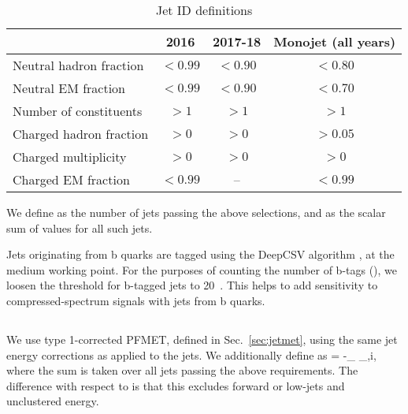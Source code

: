 \begin{table}[h]
\caption{Jet ID definitions}
\label{tab:jet_id}
\centering
\begin{tabular}{l|c|c|c}
\hline
 & 2016 & 2017-18 & Monojet (all years) \\ \hline
Neutral hadron fraction & $<0.99$ & $<0.90$ & $<0.80$ \\
Neutral EM fraction & $<0.99$ & $<0.90$ & $<0.70$ \\
Number of constituents & $>1$ & $>1$ & $>1$ \\
Charged hadron fraction & $>0$ & $>0$ & $>0.05$ \\
Charged multiplicity & $>0$ & $>0$ & $>0$ \\
Charged EM fraction & $<0.99$ & -- & $<0.99$ \\
\hline
\end{tabular}
\end{table}

We define \Nj as the number of jets passing the above selections, and \Ht as 
the scalar sum of \pt values for all such jets.

Jets originating from b quarks are tagged using the DeepCSV algorithm \cite{BTV_btagging}, at the medium working point. 
For the purposes of counting the number of b-tags (\Nb), we loosen the \pt threshold for b-tagged jets to 20~\GeV.
This helps to add sensitivity to compressed-spectrum signals with jets from b quarks.

\subsection{\ptmiss}
We use type 1-corrected PFMET, defined in Sec.~\ref{sec:jetmet}, using the same jet energy corrections
as applied to the jets. We additionally define \vMht as
\be
\vMht = -\sum_ _{,i},
\ee
where the sum is taken over all jets passing the above requirements. The difference with respect to \vMet is that
this excludes forward or low-\pt jets and unclustered energy.

